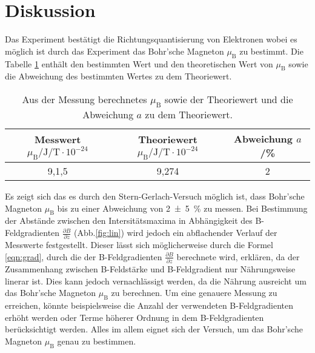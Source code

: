 \section{Diskussion}
\label{sec:Diskussion}
Das Experiment bestätigt die Richtungsquantisierung von Elektronen wobei
es möglich ist durch das Experiment das Bohr'sche Magneton $\mu_\mathrm{B}$
zu bestimmt. Die Tabelle \ref{tab:erg} enthält den bestimmten Wert
und den theoretischen  Wert von $\mu_\mathrm{B}$ sowie die Abweichung
des bestimmten Wertes zu dem Theoriewert.
\begin{table}
  \centering
  \caption{Aus der Messung berechnetes $\mu_\mathrm{B}$ sowie der Theoriewert und die Abweichung $a$ zu dem Theoriewert.}
  \label{tab:erg}
  \begin{tabular}{c c c}
    \toprule
  Messwert $\mu_\mathrm{B} / \si{\joule\per\tesla}\cdot 10^{-24} $ & Theoriewert $\mu_\mathrm{B} / \si{\joule\per\tesla }\cdot 10^{-24}$ & Abweichung $a$/\si{\percent}\\
    \midrule
9,1\pm0,5 & 9,274 & 2\pm5 \\
    \bottomrule
  \end{tabular}
\end{table}
Es zeigt sich das es durch den Stern-Gerlach-Versuch möglich ist, dass
Bohr'sche Magneton $\mu_\mathrm{B}$ bis zu einer Abweichung von \SI{2(5)}{\percent}
zu messen. Bei Bestimmung der Abstände zwischen den Intersitätsmaxima in Abhängigkeit
des B-Feldgradienten $\frac{\partial B}{\partial z}$ (Abb.\ref{fig:lin})
wird jedoch ein abflachender Verlauf der Messwerte festgestellt.
Dieser lässt sich möglicherweise durch die Formel \eqref{eqn:grad}, durch die der B-Feldgradienten $\frac{\partial B}{\partial z}$ berechnete wird,
 erklären, da der Zusammenhang zwischen B-Feldstärke und B-Feldgradient nur Nährungsweise linerar ist.
Dies kann jedoch vernachlässigt werden, da die Nährung ausreicht um das Bohr'sche Magneton $\mu_\mathrm{B}$ zu berechnen.
Um eine genauere Messung zu erreichen, könnte beispielsweise die Anzahl der
verwendeten B-Feldgradienten erhöht werden oder Terme höherer Ordnung in dem B-Feldgradienten berücksichtigt werden.
Alles im allem eignet sich der Versuch, um das Bohr'sche Magneton $\mu_\mathrm{B}$
genau zu bestimmen.
\newpage
